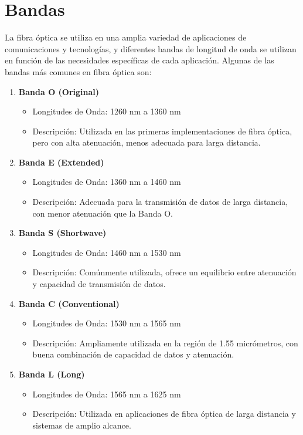 \documentclass[
	12pt, %
	fleqn, %
	a4paper, %
	oneside, %
]{LegrandOrangeBook}
\begin{document}
\section{Bandas}
La fibra óptica se utiliza en una amplia variedad de aplicaciones de comunicaciones y tecnologías, y diferentes bandas de longitud de onda se utilizan en función de las necesidades específicas de cada aplicación. Algunas de las bandas más comunes en fibra óptica son:
\begin{enumerate}
    \item \textbf{Banda O (Original)}
    \begin{itemize}
        \item Longitudes de Onda: 1260 nm a 1360 nm
        \item Descripción: Utilizada en las primeras implementaciones de fibra óptica, pero con alta atenuación, menos adecuada para larga distancia.
    \end{itemize}
    
    \item \textbf{Banda E (Extended)}
    \begin{itemize}
        \item Longitudes de Onda: 1360 nm a 1460 nm
        \item Descripción: Adecuada para la transmisión de datos de larga distancia, con menor atenuación que la Banda O.
    \end{itemize}
    
    \item \textbf{Banda S (Shortwave)}
    \begin{itemize}
        \item Longitudes de Onda: 1460 nm a 1530 nm
        \item Descripción: Comúnmente utilizada, ofrece un equilibrio entre atenuación y capacidad de transmisión de datos.
    \end{itemize}
    
    \item \textbf{Banda C (Conventional)}
    \begin{itemize}
        \item Longitudes de Onda: 1530 nm a 1565 nm
        \item Descripción: Ampliamente utilizada en la región de 1.55 micrómetros, con buena combinación de capacidad de datos y atenuación.
    \end{itemize}
    
    \item \textbf{Banda L (Long)}
    \begin{itemize}
        \item Longitudes de Onda: 1565 nm a 1625 nm
        \item Descripción: Utilizada en aplicaciones de fibra óptica de larga distancia y sistemas de amplio alcance.
    \end{itemize}
    

\end{enumerate}
\end{document}

